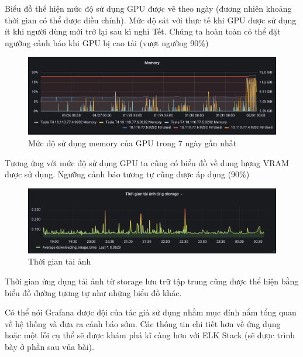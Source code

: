 Biểu đồ thể hiện mức độ sử dụng GPU được vẽ theo ngày (đương nhiên khoảng thời gian có thể được điều chính). Mức độ sát với thực tế khi GPU được sử dụng ít khi người dùng mới trở lại sau kì nghỉ Tết. Chúng ta hoàn toàn có thể đặt ngưỡng cảnh báo khi GPU bị cao tải (vượt ngưỡng 90\%)

\begin{figure}[H] %
    \centering %
    \includegraphics[width=1\textwidth]{figures/vram.png} 
    \caption{Mức độ sử dụng memory của GPU trong 7 ngày gần nhất} %
    \label{fig:elk_01}
\end{figure}

Tương ứng với mức độ sử dụng GPU ta cũng có biểu đồ về dung lượng VRAM được sử dụng. Ngưỡng cảnh báo tương tự cũng được áp dụng (90\%)

\begin{figure}[H] %
    \centering %
    \includegraphics[width=1\textwidth]{figures/download_time.png} 
    \caption{Thời gian tải ảnh} %
    \label{fig:elk_01}
\end{figure}

Thời gian ứng dụng tải ảnh từ storage lưu trữ tập trung cũng được thể hiện bằng biểu đồ đường tương tự như những biểu đồ khác. 

Có thể nói Grafana được đội của tác giả sử dụng nhằm mục đính nắm tổng quan về hệ thống và đưa ra cảnh báo sớm. Các thông tin chi tiết hơn về ứng dụng hoặc một lỗi cụ thể sẽ được khám phá kĩ càng hơn với ELK Stack (sẽ được trình bày ở phần sau vủa bài).